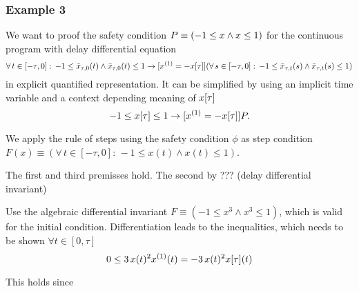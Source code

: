 \documentclass[10pt]{report}
\begin{document}
        \subsubsection{Example 3}
            \label{sec:ddi-example-3}

            We want to proof the safety condition $P\equiv(-1\leq x\wedge x\leq 1)$ for the continuous program with delay differential equation
            \begin{equation}
                \forall\,t\in[-\tau,0]:\,-1\leq\xbartaut{0}(t)\wedge\xbartaut{0}(t)\leq 1
                \rightarrow
                [\D{x}=-\xtau] (\forall\,s\in[-\tau,0]:\,-1\leq\xbartaut{t}(s)\wedge\xbartaut{t}(s)\leq 1)
            \end{equation}
            in explicit quantified representation. It can be simplified by using an implicit time variable and a context depending meaning of $x[\tau]$
            \begin{equation}
                -1\leq\xtau\leq 1 \rightarrow [\D{x}=-\xtau]\asfml.
            \end{equation}

            We apply the rule of steps using the safety condition $\phi$ as step condition $F(x)\equiv(\forall\,t\in[-\tau,0]:\,-1\leq x(t)\wedge x(t)\leq 1)$.

            The first and third premisses hold. The second by ??? (delay differential invariant)

            Use the algebraic differential invariant $F\equiv(-1\leq x^3\wedge x^3\leq1)$, which is valid for the initial condition. Differentiation leads to the inequalities, which needs to be shown $\forall t\in[0,\tau]$
            \begin{equation}
                0\leq 3\,x(t)^2 \D{x}(t) = -3\,x(t)^2 \xtau(t)
            \end{equation}

            This holds since


\nocite{*}


\end{document}

